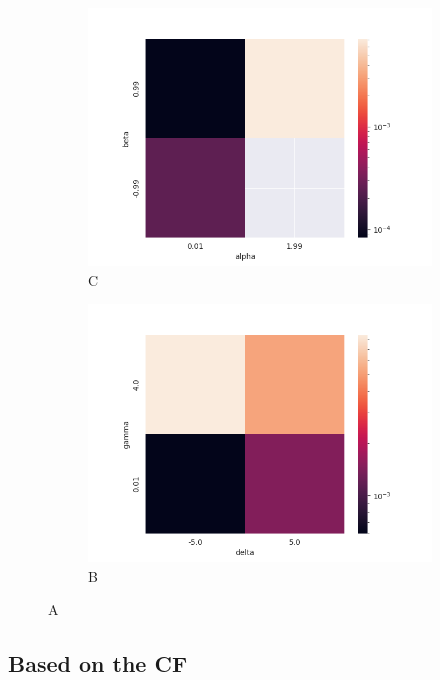 \documentclass{article}
\begin{document}
		\begin{figure}[H]
			\begin{subfigure}{.5\textwidth}
				\centering
				\includegraphics[width=1\linewidth]{images/heatmap_cdf_MAE_alpha_beta.png}
				\caption{C}
			\end{subfigure}
			\begin{subfigure}[r]{.5\textwidth}
				\centering
				\includegraphics[width=1\linewidth]{images/heatmap_cdf_MAE_gamma_delta.png}
				\caption{B}
			\end{subfigure}
			\caption{A}
		\end{figure}

		\subsection{Based on the CF}
\end{document}
